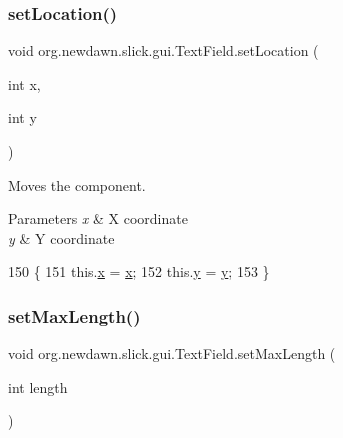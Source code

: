 \subsubsection{\texorpdfstring{set\+Location()}{setLocation()}}
{\footnotesize\ttfamily void org.\+newdawn.\+slick.\+gui.\+Text\+Field.\+set\+Location (\begin{DoxyParamCaption}\item[{int}]{x,  }\item[{int}]{y }\end{DoxyParamCaption})\hspace{0.3cm}{\ttfamily [inline]}}

Moves the component.


\begin{DoxyParams}{Parameters}
{\em x} & X coordinate \\
\hline
{\em y} & Y coordinate \\
\hline
\end{DoxyParams}

\begin{DoxyCode}
150                                           \{
151         this.\mbox{\hyperlink{classorg_1_1newdawn_1_1slick_1_1gui_1_1_text_field_a05dd91af6b1552f194c1aadbdf894c8c}{x}} = \mbox{\hyperlink{classorg_1_1newdawn_1_1slick_1_1gui_1_1_text_field_a05dd91af6b1552f194c1aadbdf894c8c}{x}};
152         this.\mbox{\hyperlink{classorg_1_1newdawn_1_1slick_1_1gui_1_1_text_field_acb0df9f048eabd20f6d5d40799b48706}{y}} = \mbox{\hyperlink{classorg_1_1newdawn_1_1slick_1_1gui_1_1_text_field_acb0df9f048eabd20f6d5d40799b48706}{y}};
153     \}
\end{DoxyCode}
\mbox{\label{classorg_1_1newdawn_1_1slick_1_1gui_1_1_text_field_abd9e02715d6b12fbac7c79adc6fe70dc}} 
\subsubsection{\texorpdfstring{set\+Max\+Length()}{setMaxLength()}}
{\footnotesize\ttfamily void org.\+newdawn.\+slick.\+gui.\+Text\+Field.\+set\+Max\+Length (\begin{DoxyParamCaption}\item[{int}]{length }\end{DoxyParamCaption})\hspace{0.3cm}{\ttfamily [inline]}}

